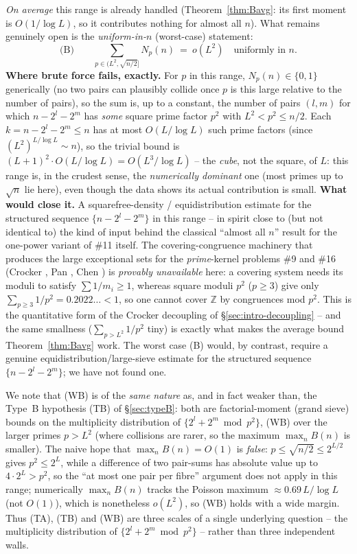 \documentclass[11pt]{article}
\theoremstyle{plain}
\theoremstyle{definition}
\theoremstyle{remark}
\newcommand{\Z}{\mathbb{Z}}
\begin{document}
\emph{On average} this range is already handled (Theorem~\ref{thm:Bavg}: its
first moment is $O(1/\log L)$, so it contributes nothing for almost all $n$).
What remains genuinely open is the \emph{uniform-in-$n$} (worst-case) statement:
\[
\text{(B)}\qquad
\sum_{p\in(L^2,\sqrt{n/2}]}N_p(n)\ =\ o(L^2)\quad\text{uniformly in }n.
\]
\textbf{Where brute force fails, exactly.} For $p$ in this range,
$N_p(n)\in\{0,1\}$ generically (no two pairs can plausibly collide once $p$
is this large relative to the number of pairs), so the sum is, up to a
constant, the number of pairs $(l,m)$ for which $n-2^l-2^m$ has \emph{some}
square prime factor $p^2$ with $L^2<p^2\le n/2$. Each $k=n-2^l-2^m\le n$ has
at most $O(L/\log L)$ such prime factors (since $(L^2)^{L/\log L}\sim n$), so
the trivial bound is $(L+1)^2\cdot O(L/\log L)=O(L^3/\log L)$ -- the
\emph{cube}, not the square, of $L$: this range is, in the crudest sense, the
\emph{numerically dominant} one (most primes up to $\sqrt n$ lie here), even
though the data shows its actual contribution is small. \textbf{What would
close it.} A squarefree-density / equidistribution estimate for the
structured sequence $\{n-2^l-2^m\}$ in this range -- in spirit close to (but
not identical to) the kind of input behind the classical ``almost all $n$''
result for the one-power variant of \#11 itself. The covering-congruence
machinery that produces the large exceptional sets for the \emph{prime}-kernel
problems \#9 and \#16 (Crocker \cite{Crocker1971}, Pan \cite{Pan2011}, Chen
\cite{Chen2024}) is \emph{provably unavailable} here: a covering system needs
its moduli to satisfy $\sum1/m_i\ge1$, whereas square moduli $p^2$ ($p\ge3$)
give only $\sum_{p\ge3}1/p^2=0.2022\ldots<1$, so one cannot cover $\Z$ by
congruences mod $p^2$. This is the quantitative form of the Crocker decoupling
of \S\ref{sec:intro-decoupling} -- and the same smallness ($\sum_{p>L^2}1/p^2$
tiny) is exactly what makes the average bound Theorem~\ref{thm:Bavg} work. The
worst case (B) would, by contrast, require a genuine equidistribution/large-sieve
estimate for the structured sequence $\{n-2^l-2^m\}$; we have not found one.

We note that (WB) is of the \emph{same nature} as, and in fact weaker than, the
Type~B hypothesis (TB) of \S\ref{sec:typeB}: both are factorial-moment (grand
sieve) bounds on the multiplicity distribution of $\{2^l+2^m\bmod p^2\}$, (WB)
over the larger primes $p>L^2$ (where collisions are rarer, so the maximum
$\max_nB(n)$ is smaller). The naive hope that $\max_nB(n)=O(1)$ is \emph{false}:
$p\le\sqrt{n/2}\le2^{L/2}$ gives $p^2\le2^L$, while a difference of two pair-sums
has absolute value up to $4\cdot2^L>p^2$, so the ``at most one pair per fibre''
argument does not apply in this range; numerically $\max_nB(n)$ tracks the
Poisson maximum $\approx0.69\,L/\log L$ (not $O(1)$), which is nonetheless
$o(L^2)$, so (WB) holds with a wide margin. Thus (TA), (TB) and (WB) are three
scales of a single underlying question -- the multiplicity distribution of
$\{2^l+2^m\bmod p^2\}$ -- rather than three independent walls.
\end{document}

